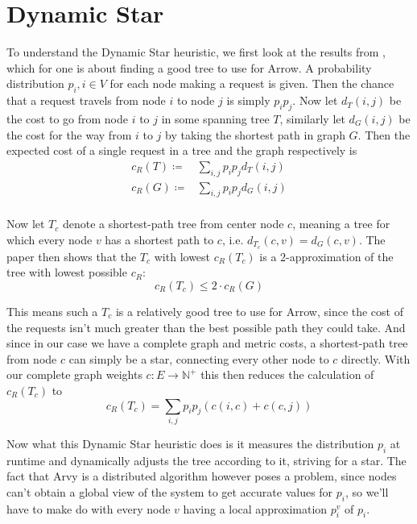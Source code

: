 \documentclass[a4paper, oneside]{discothesis}
\begin{document}
\section{Dynamic Star}
\label{alg:dynstar}

To understand the Dynamic Star heuristic, we first look at the results from \cite{Peleg}, which for one is about finding a good tree to use for Arrow. A probability distribution $p_i, i\in V$ for each node making a request is given. Then the chance that a request travels from node $i$ to node $j$ is simply $p_ip_j$. Now let $d_T(i,j)$ be the cost to go from node $i$ to $j$ in some spanning tree $T$, similarly let $d_G(i,j)$ be the cost for the way from $i$ to $j$ by taking the shortest path in graph $G$. Then the expected cost of a single request in a tree and the graph respectively is
\begin{equation}
\begin{split}
c_R(T)\coloneqq & \sum_{i,j}p_ip_jd_T(i,j) \\
c_R(G)\coloneqq & \sum_{i,j}p_ip_jd_G(i,j) \\
\end{split}
\end{equation}

Now let $T_c$ denote a shortest-path tree from center node $c$, meaning a tree for which every node $v$ has a shortest path to $c$, i.e. $d_{T_c}(c,v)=d_G(c,v)$. The paper then shows that the $T_c$ with lowest $c_R(T_c)$ is a 2-approximation of the tree with lowest possible $c_R$:
\begin{equation}
c_R(T_c)\leq 2\cdot c_R(G)
\end{equation}

This means such a $T_c$ is a relatively good tree to use for Arrow, since the cost of the requests isn't much greater than the best possible path they could take. And since in our case we have a complete graph and metric costs, a shortest-path tree from node $c$ can simply be a star, connecting every other node to $c$ directly. With our complete graph weights $c:E\to\mathbb{N}^+$ this then reduces the calculation of $c_R(T_c)$ to
\begin{equation}
\label{dynstarc}
c_R(T_c)=\sum_{i,j}p_ip_j(c(i,c)+c(c,j))
\end{equation}

Now what this Dynamic Star heuristic does is it measures the distribution $p_i$ at runtime and dynamically adjusts the tree according to it, striving for a star. The fact that Arvy is a distributed algorithm however poses a problem, since nodes can't obtain a global view of the system to get accurate values for $p_i$, so we'll have to make do with every node $v$ having a local approximation $p_i^v$ of $p_i$.
\end{document}
